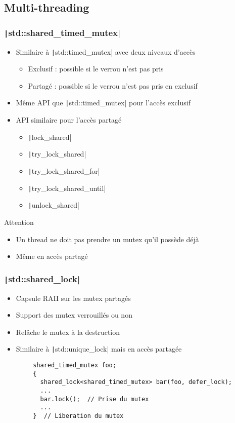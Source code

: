 \documentclass[C++.tex]{subfiles}
\begin{document}
\subsection*{Multi-threading}
\begin{frame}[fragile]
	\frametitle{\texttt|std::shared_timed_mutex|}
	\begin{itemize}
		\item Similaire à \texttt|std::timed_mutex| avec deux niveaux d'accès
		\begin{itemize}
			\item Exclusif : possible si le verrou n'est pas pris
			\item Partagé : possible si le verrou n'est pas pris en exclusif
		\end{itemize}
		\item Même API que \texttt|std::timed_mutex| pour l'accès exclusif
		\item API similaire pour l'accès partagé
		\begin{itemize}
			\item \texttt|lock_shared|
			\item \texttt|try_lock_shared|
			\item \texttt|try_lock_shared_for|
			\item \texttt|try_lock_shared_until|
			\item \texttt|unlock_shared|
		\end{itemize}
	\end{itemize}

	\begin{alertblock}{Attention}
		\begin{itemize}
			\item Un thread ne doit pas prendre un mutex qu'il possède déjà
			\item Même en accès partagé
		\end{itemize}
	\end{alertblock}

\end{frame}

\begin{frame}[fragile]
	\frametitle{\texttt|std::shared_lock|}
	\begin{itemize}
		\item Capsule RAII sur les mutex partagés
		\item Support des mutex verrouillés ou non
		\item Relâche le mutex à la destruction
		\item Similaire à \texttt|std::unique_lock| mais en accès partagée
	\end{itemize}

	\begin{verbatim}
		shared_timed_mutex foo;
		{
		  shared_lock<shared_timed_mutex> bar(foo, defer_lock);
		  ...
		  bar.lock();  // Prise du mutex
		  ...
		}  // Liberation du mutex
	\end{verbatim}
\end{frame}
\end{document}
